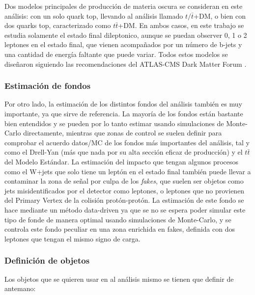 \documentclass[a4paper, 10pt, openright]{report}
\begin{document}
\begin{appendices}
Dos modelos principales de producci\'{o}n de materia oscura se consideran en este an\'{a}lisis: con un solo quark top, llevando al an\'{a}lisis llamado $t/\bar t$+DM, o bien con dos quarks top, caracterizado como $t \bar t$+DM. En ambos casos, en este trabajo se estudia solamente el estado final dileptonico, aunque se puedan observer 0, 1 o 2 leptones en el estado final, que vienen acompa\~{n}ados por un n\'{u}mero de b-jets y una cantidad de energ\'{i}a faltante que puede variar. Todos estos modelos se dise\~{n}aron siguiendo las recomendaciones del ATLAS-CMS Dark Matter Forum \cite{Forum}.

\subsubsection{Estimaci\'{o}n de fondos}

Por otro lado, la estimaci\'{o}n de los distintos fondos del an\'{a}lisis tambi\'{e}n es muy importante, ya que sirve de referencia. La mayor\'{i}a de los fondos est\'{a}n bastante bien entendidos y se pueden por lo tanto estimar usando simulaciones de Monte-Carlo directamente, mientras que zonas de control se suelen definir para comprobar el acuerdo datos/\ac{MC} de los fondos m\'{a}s importantes del an\'{a}lisis, tal y como el Drell-Yan (m\'{a}s que nada por su alta secci\'{o}n eficaz de producci\'{o}n) y el $t \bar t$ del Modelo Est\'{a}ndar. La estimaci\'{o}n del impacto que tengan algunos procesos como el W+jets que solo tiene un lept\'{o}n en el estado final tambi\'{e}n puede llevar a contaminar la zona de se\~{n}al por culpa de los \textit{fakes}, que suelen ser objetos como jets misidentificados por el detector como leptones, o leptones que no provienen del Primary Vertex de la colisi\'{o}n prot\'{o}n-prot\'{o}n. La estimaci\'{o}n de este fondo se hace mediante un m\'{e}todo data-driven ya que se no se espera poder simular este tipo de fonde de manera optimal usando simulaciones de Monte-Carlo, y se controla este fondo peculiar en una zona enrichida en fakes, definida con dos leptones que tengan el mismo signo de carga.

\subsubsection{Definici\'{o}n de objetos}

Los objetos que se quieren usar en al an\'{a}lisis mismo se tienen que definir de antemano:


\end{appendices}
\end{document}
